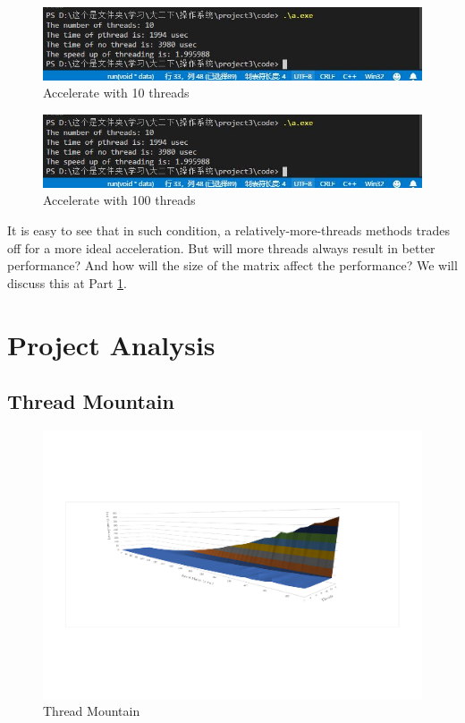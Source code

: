 \documentclass[12pt,a4paper]{article}
\begin{document}
\begin{minipage}{0.5\textwidth}
	\begin{figure}[H]
		\centering
		\includegraphics[scale= 0.45]{./fig/win_result_10.jpg}
		\caption{Accelerate with 10 threads}
		\label{fig::windows 10 threads}
	\end{figure}
\end{minipage}
\begin{minipage}{0.5\textwidth}
	\begin{figure}[H]
		\centering
		\includegraphics[scale= 0.45]{./fig/win_result_10.jpg}
		\caption{Accelerate with 100 threads}
		\label{fig::windows 100 threads}
	\end{figure}
\end{minipage}
\par \quad
\par
It is easy to see that in such condition, a relatively-more-threads methods trades off for a more ideal acceleration. But will more threads always result in better performance? And how will the size of the matrix affect the performance? We will discuss this at Part \ref{part::project analysis}.
\section{Project Analysis}\label{part::project analysis}

\subsection{Thread Mountain}
\begin{figure}[H]
	\centering
	\includegraphics[scale= 0.7]{./fig/data_test.pdf}
	\caption{Thread Mountain}
	\label{fig::Thread Mountain}
\end{figure}
\end{document}

